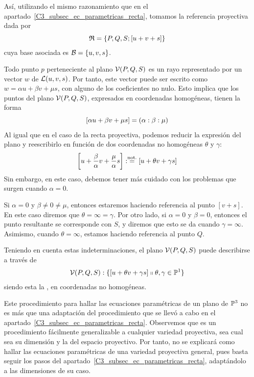 Así, utilizando el mismo razonamiento que en el apartado~\ref{C3_subsec_ec_parametricas_recta}, tomamos la referencia proyectiva dada por
\[\mathfrak{R}=\{P,Q,S;\left [ u+v+s \right ]\}\]
cuya base asociada es $\mathcal{B}=\{u,v,s\}$.

Todo punto $p$ perteneciente al plano $\mathcal{V}(P,Q,S)$ es un rayo representado por un vector $w$ de $\mathcal{L}(u,v,s)$. Por tanto, este vector puede ser escrito como $w=\alpha u +\beta v+\mu s$, con alguno de los coeficientes no nulo. Esto implica que los puntos del plano $\mathcal{V}(P,Q,S)$, expresados en coordenadas homogéneas, tienen la forma
\[\left [ \alpha u+\beta v+\mu s \right ]=(\alpha:\beta:\mu)\]
Al igual que en el caso de la recta proyectiva, podemos reducir la expresión del plano y reescribirlo en función de dos coordenadas no homogéneas $\theta$ y $\gamma$:
\[\left [ u+\frac{\beta}{\alpha}v+\frac{\mu}{\alpha}s \right ]:\stackrel{\textrm{not.}}{=}\left [ u+\theta v+\gamma s \right ]\]
Sin embargo, en este caso, debemos tener más cuidado con los problemas que surgen cuando $\alpha=0$.

Si $\alpha=0$ y $\beta\not=0\not=\mu$, entonces estaremos haciendo referencia al punto $[v+s]$. En este caso diremos que $\theta=\infty=\gamma$. Por otro lado, si $\alpha=0$ y $\beta=0$, entonces el punto resultante se corresponde con $S$, y diremos que esto se da cuando $\gamma=\infty$. Asimismo, cuando $\theta=\infty$, estamos haciendo referencia al punto $Q$.

Teniendo en cuenta estas indeterminaciones, el plano $\mathcal{V}(P,Q,S)$ puede describirse a través de
\begin{equation}
\label{C3_eq_descripcionPlanoP1}
\mathcal{V}(P,Q,S):\{\left [ u+\theta v+\gamma s \right ]\shortparallel \theta,\gamma\in\mathbb{P}^1\}
\end{equation}
siendo esta la , en coordenadas no homogéneas.

\begin{obs}
	Este procedimiento para hallar las ecuaciones paramétricas de un plano de $\mathbb{P}^3$ no es más que una adaptación del procedimiento que se llevó a cabo en el apartado~\ref{C3_subsec_ec_parametricas_recta}. Observemos que es un procedimiento fácilmente generalizable a cualquier variedad proyectiva, sea cual sea su dimensión y la del espacio proyectivo. Por tanto, no se explicará como hallar las ecuaciones paramétricas de una variedad proyectiva general, pues basta seguir los pasos del apartado~\ref{C3_subsec_ec_parametricas_recta}, adaptándolo a las dimensiones de su caso.
\end{obs}

